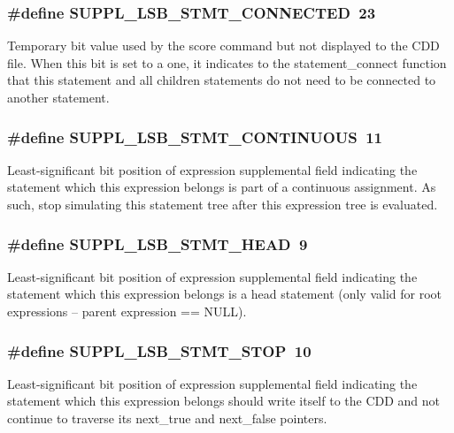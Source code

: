 \subsubsection{\setlength{\rightskip}{0pt plus 5cm}\#define SUPPL\_\-LSB\_\-STMT\_\-CONNECTED\ 23}\label{group__expr__suppl_a18}


Temporary bit value used by the score command but not displayed to the CDD file. When this bit is set to a one, it indicates to the statement\_\-connect function that this statement and all children statements do not need to be connected to another statement. 
\subsubsection{\setlength{\rightskip}{0pt plus 5cm}\#define SUPPL\_\-LSB\_\-STMT\_\-CONTINUOUS\ 11}\label{group__expr__suppl_a6}


Least-significant bit position of expression supplemental field indicating the statement which this expression belongs is part of a continuous assignment. As such, stop simulating this statement tree after this expression tree is evaluated. 
\subsubsection{\setlength{\rightskip}{0pt plus 5cm}\#define SUPPL\_\-LSB\_\-STMT\_\-HEAD\ 9}\label{group__expr__suppl_a4}


Least-significant bit position of expression supplemental field indicating the statement which this expression belongs is a head statement (only valid for root expressions -- parent expression == NULL). 
\subsubsection{\setlength{\rightskip}{0pt plus 5cm}\#define SUPPL\_\-LSB\_\-STMT\_\-STOP\ 10}\label{group__expr__suppl_a5}


Least-significant bit position of expression supplemental field indicating the statement which this expression belongs should write itself to the CDD and not continue to traverse its next\_\-true and next\_\-false pointers. 
